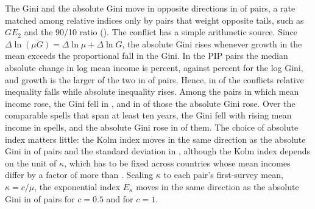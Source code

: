 \documentclass[12pt]{article}
\theoremstyle{plain}
\theoremstyle{definition}
\theoremstyle{remark}
\begin{document}
The Gini and the absolute Gini move in opposite directions in \PipDisGiniAbs{} of pairs, a rate matched among relative indices only by pairs that weight opposite tails, such as $GE_2$ and the 90/10 ratio (\PipDisGeTwoPNinety{}).
The conflict has a simple arithmetic source.
Since $\Delta \ln(\mu G) = \Delta \ln \mu + \Delta \ln G$, the absolute Gini rises whenever growth in the mean exceeds the proportional fall in the Gini.
In the PIP pairs the median absolute change in log mean income is \PipMedGrowth{} percent, against \PipMedDlnGini{} percent for the log Gini, and growth is the larger of the two in \PipShareGrowthExceeds{} of pairs.
Hence, in \PipOppGiniDownAbsUp{} of the conflicts relative inequality falls while absolute inequality rises.
Among the \PipNGrowth{} pairs in which mean income rose, the Gini fell in \PipGiniFellGrowth{}, and in \PipAbsUpGivenGiniDownGrowth{} of those the absolute Gini rose.
Over the \PipLongN{} comparable spells that span at least ten years, the Gini fell with rising mean income in \PipLongNGiniDownGrowth{} spells, and the absolute Gini rose in \PipLongAbsUpGivenGiniDown{} of them.
The choice of absolute index matters little: the Kolm index moves in the same direction as the absolute Gini in \PipKolmAgree{} of pairs and the standard deviation in \PipSdAgree{}, although the Kolm index depends on the unit of $\kappa$, which has to be fixed across countries whose mean incomes differ by a factor of more than \PipIncomeRange{}.
Scaling $\kappa$ to each pair's first-survey mean, $\kappa = c/\mu$, the exponential index $E_\kappa$ moves in the same direction as the absolute Gini in \PipEkappaHalfAgree{} of pairs for $c = 0.5$ and \PipEkappaOneAgree{} for $c = 1$.
\end{document}
